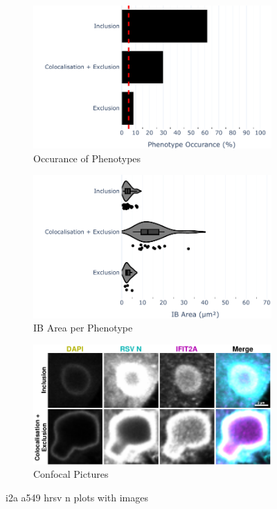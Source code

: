 \begin{figure}
    \begin{subfigure}{0.5\textwidth}
    \includegraphics[width=1\linewidth]{10. Chapter 5/Figs/01. Infection/01. IFIT2A/01. bar_i2a_a549-n.pdf} 
    \caption[]{Occurance of Phenotypes}
    \end{subfigure}
    \begin{subfigure}{0.5\textwidth}
    \includegraphics[width=1\linewidth]{10. Chapter 5/Figs/01. Infection/01. IFIT2A/02. violin_i2a_a549-n.pdf}
    \caption[]{IB Area per Phenotype}
    \end{subfigure}

    \begin{subfigure}{1\textwidth}
    \includegraphics[width=1\linewidth]{10. Chapter 5/Figs/01. Infection/01. IFIT2A/03. i2a a549 hrsv n.pdf} 
    \caption[]{Confocal Pictures}
    \end{subfigure}
    \caption[i2a a549 hrsv n plots with images]{i2a a549 hrsv n plots with images}
    \label{fig:i2a a549 hrsv n plots with images}
\end{figure}

